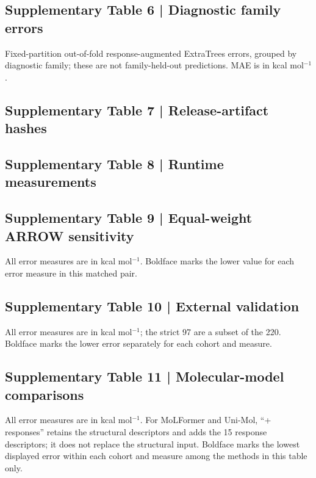 \subsection*{Supplementary Table 6 | Diagnostic family errors}
\small
Fixed-partition out-of-fold response-augmented ExtraTrees errors, grouped by diagnostic family; these are
not family-held-out predictions. MAE is in kcal mol$^{-1}$.
\par\smallskip\noindent

\normalsize

\subsection*{Supplementary Table 7 | Release-artifact hashes}
\scriptsize
\resizebox{\textwidth}{!}{}
\normalsize

\subsection*{Supplementary Table 8 | Runtime measurements}
\small

\normalsize

\subsection*{Supplementary Table 9 | Equal-weight ARROW sensitivity}
\small
All error measures are in kcal mol$^{-1}$.
Boldface marks the lower value for each error measure in this matched pair.
\par\smallskip\noindent

\normalsize

\subsection*{Supplementary Table 10 | External validation}
\small
All error measures are in kcal mol$^{-1}$; the strict 97 are a subset of the 220.
Boldface marks the lower error separately for each cohort and measure.
\par\smallskip\noindent
\resizebox{\textwidth}{!}{}
\normalsize

\clearpage
\subsection*{Supplementary Table 11 | Molecular-model comparisons}
\small
All error measures are in kcal mol$^{-1}$. For MoLFormer and Uni-Mol, ``+ responses''
retains the structural descriptors and adds the 15 response descriptors; it does
not replace the structural input. Boldface marks the lowest displayed error
within each cohort and measure among the methods in this table only.

\normalsize

